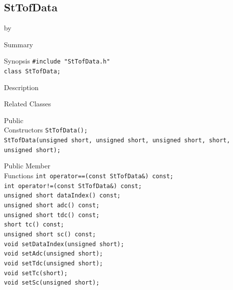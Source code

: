 \documentclass[twoside]{article}
\newcommand{\entrylabel}[1]{\mbox{\textbf{{#1}}}\hfil}%
\newenvironment{entry}
{\begin{list}{}%
    {\renewcommand{\makelabel}{\entrylabel}%
     \setlength{\labelwidth}{90pt}%
     \setlength{\leftmargin}{\labelwidth}
     \advance\leftmargin by \labelsep%
      }%
    }%
  {\end{list}}
\newcommand{\Entrylabel}[1]%
{\raisebox{0pt}[1ex][0pt]{\makebox[\labelwidth][l]%
    {\parbox[t]{\labelwidth}{\hspace{0pt}\textbf{{#1}}}}}}
\newenvironment{Entry}%
{\renewcommand{\entrylabel}{\Entrylabel}\begin{entry}}%
  {\end{entry}}
\begin{document}
\subsection{StTofData}
\label{sec:StTofData}
\begin{Entry}
\item[Summary]
\item[Synopsis]
    \verb+#include "StTofData.h"+\\
    \verb+class StTofData;+\\
\item[Description]
\item[Related Classes]
\item[Public\\ Constructors]
    \verb+StTofData();+\\
    \verb+StTofData(unsigned short, unsigned short, unsigned short, short, unsigned short);+\\
\item[Public Member\\ Functions]
    \verb+int operator==(const StTofData&) const;+\\
    \verb+int operator!=(const StTofData&) const;+\\
    \verb+unsigned short dataIndex() const;+\\
    \verb+unsigned short adc() const;+\\
    \verb+unsigned short tdc() const;+\\
    \verb+short tc() const;+\\
    \verb+unsigned short sc() const;+\\
    \verb+void setDataIndex(unsigned short);+\\
    \verb+void setAdc(unsigned short);+\\
    \verb+void setTdc(unsigned short);+\\
    \verb+void setTc(short);+\\
    \verb+void setSc(unsigned short);+\\
\end{Entry}
\clearpage
\end{document}
